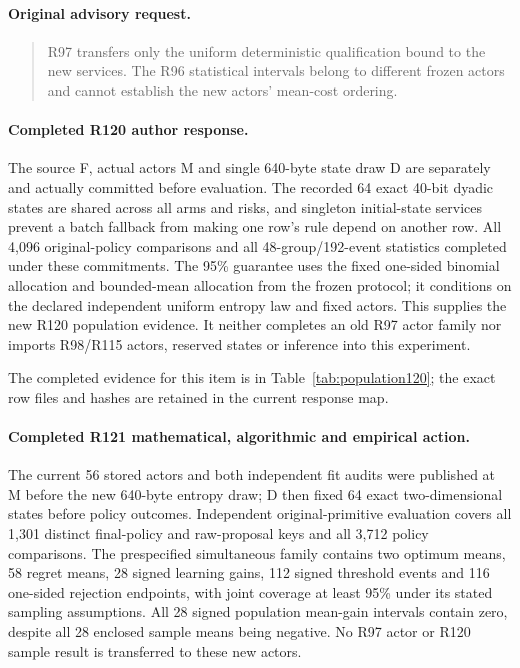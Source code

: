 \paragraph{Original advisory request.}
\begin{quote}
R97 transfers only the uniform deterministic qualification bound to the new services. The R96 statistical intervals belong to different frozen actors and cannot establish the new actors' mean-cost ordering.
\end{quote}

\paragraph{Completed R120 author response.}
The source F, actual actors M and single 640-byte state draw D are separately and actually committed before evaluation. The recorded 64 exact 40-bit dyadic states are shared across all arms and risks, and singleton initial-state services prevent a batch fallback from making one row's rule depend on another row. All 4,096 original-policy comparisons and all 48-group/192-event statistics completed under these commitments. The 95\% guarantee uses the fixed one-sided binomial allocation and bounded-mean allocation from the frozen protocol; it conditions on the declared independent uniform entropy law and fixed actors. This supplies the new R120 population evidence. It neither completes an old R97 actor family nor imports R98/R115 actors, reserved states or inference into this experiment.

The completed evidence for this item is in Table~\ref{tab:population120}; the exact row files and hashes are retained in the current response map.

\paragraph{Completed R121 mathematical, algorithmic and empirical action.}
The current 56 stored actors and both independent fit audits were published at M before the new 640-byte entropy draw; D then fixed 64 exact two-dimensional states before policy outcomes. Independent original-primitive evaluation covers all 1,301 distinct final-policy and raw-proposal keys and all 3,712 policy comparisons. The prespecified simultaneous family contains two optimum means, 58 regret means, 28 signed learning gains, 112 signed threshold events and 116 one-sided rejection endpoints, with joint coverage at least 95\% under its stated sampling assumptions. All 28 signed population mean-gain intervals contain zero, despite all 28 enclosed sample means being negative. No R97 actor or R120 sample result is transferred to these new actors.

